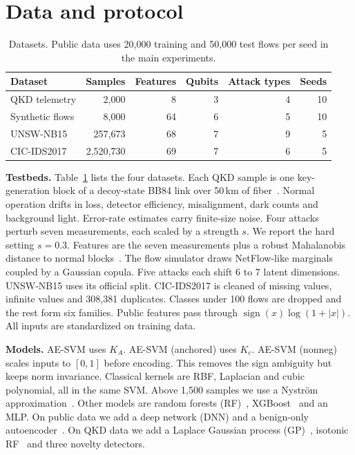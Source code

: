 \documentclass[pdflatex,sn-mathphys-num,lineno]{sn-jnl}
\theoremstyle{thmstyleone}
\begin{document}
\section{Data and protocol}
\label{sec:protocol}

\begin{table}[t]
  \centering
  \caption{Datasets. Public data uses 20,000 training and 50,000 test flows per
  seed in the main experiments.}
  \label{tab:data}
  \small
  \begin{tabular}{lrrrrr}
    \toprule
    Dataset & Samples & Features & Qubits & Attack types & Seeds \\
    \midrule
    QKD telemetry & 2,000 & 8 & 3 & 4 & 10 \\
    Synthetic flows & 8,000 & 64 & 6 & 5 & 10 \\
    UNSW-NB15 & 257,673 & 68 & 7 & 9 & 5 \\
    CIC-IDS2017 & 2,520,730 & 69 & 7 & 6 & 5 \\
    \bottomrule
  \end{tabular}
\end{table}

\textbf{Testbeds.} Table~\ref{tab:data} lists the four datasets. Each QKD sample is
one key-generation block of a decoy-state BB84 link over 50\,km of
fiber~\cite{lo2005decoy}. Normal operation drifts in loss, detector efficiency,
misalignment, dark counts and background light. Error-rate estimates carry
finite-size noise. Four attacks perturb seven measurements, each scaled by a
strength $s$. We report the hard setting $s=0.3$. Features are the seven
measurements plus a robust Mahalanobis distance to normal
blocks~\cite{rousseeuw1999fast}. The flow simulator draws NetFlow-like marginals
coupled by a Gaussian copula. Five attacks each shift 6 to 7 latent dimensions.
UNSW-NB15 uses its official split. CIC-IDS2017 is cleaned of missing values,
infinite values and 308,381 duplicates. Classes under 100 flows are dropped and
the rest form six families. Public features pass through
$\operatorname{sign}(x)\log(1+|x|)$. All inputs are standardized on training data.

\textbf{Models.} AE-SVM uses $K_A$. AE-SVM (anchored) uses $K_c$. AE-SVM (nonneg)
scales inputs to $[0,1]$ before encoding. This removes the sign ambiguity but keeps
norm invariance. Classical kernels are RBF, Laplacian and cubic polynomial, all in
the same SVM. Above 1,500 samples we use a Nystr\"om
approximation~\cite{williams2001nystrom}. Other models are random forests
(RF)~\cite{breiman2001random}, XGBoost~\cite{chen2016xgboost} and an MLP. On public
data we add a deep network (DNN) and a benign-only
autoencoder~\cite{mirsky2018kitsune}. On QKD data we add a Laplace Gaussian process
(GP)~\cite{rasmussen2006gaussian}, isotonic RF~\cite{zadrozny2002transforming} and
three novelty detectors.
\end{document}
